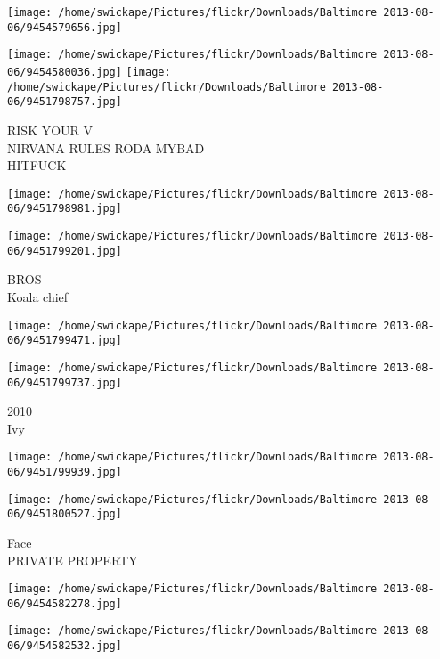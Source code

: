 \documentclass[10pt,letterpaper]{article}
\begin{document}
\texttt{[image: /home/swickape/Pictures/flickr/Downloads/Baltimore 2013-08-06/9454579656.jpg]}

\vspace{0.25in}
\texttt{[image: /home/swickape/Pictures/flickr/Downloads/Baltimore 2013-08-06/9454580036.jpg]}
\texttt{[image: /home/swickape/Pictures/flickr/Downloads/Baltimore 2013-08-06/9451798757.jpg]}

RISK YOUR V\\
NIRVANA RULES RODA MYBAD\\
HITFUCK\\
\pagebreak

\texttt{[image: /home/swickape/Pictures/flickr/Downloads/Baltimore 2013-08-06/9451798981.jpg]}

\vspace{0.25in}
\texttt{[image: /home/swickape/Pictures/flickr/Downloads/Baltimore 2013-08-06/9451799201.jpg]}

BROS\\
Koala chief\\
\pagebreak

\texttt{[image: /home/swickape/Pictures/flickr/Downloads/Baltimore 2013-08-06/9451799471.jpg]}

\vspace{0.25in}
\texttt{[image: /home/swickape/Pictures/flickr/Downloads/Baltimore 2013-08-06/9451799737.jpg]}

2010\\
Ivy\\
\pagebreak

\texttt{[image: /home/swickape/Pictures/flickr/Downloads/Baltimore 2013-08-06/9451799939.jpg]}

\vspace{0.25in}
\texttt{[image: /home/swickape/Pictures/flickr/Downloads/Baltimore 2013-08-06/9451800527.jpg]}

Face\\
PRIVATE PROPERTY\\
\pagebreak

\texttt{[image: /home/swickape/Pictures/flickr/Downloads/Baltimore 2013-08-06/9454582278.jpg]}

\vspace{0.25in}
\texttt{[image: /home/swickape/Pictures/flickr/Downloads/Baltimore 2013-08-06/9454582532.jpg]}
\end{document}
